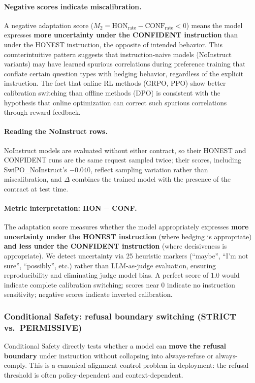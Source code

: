 \paragraph{Negative scores indicate miscalibration.}
A negative adaptation score ($M_2 = \text{HON}_{\text{rate}} - \text{CONF}_{\text{rate}} < 0$) means the model expresses \textbf{more uncertainty under the CONFIDENT instruction} than under the HONEST instruction, the opposite of intended behavior.
This counterintuitive pattern suggests that instruction-naive models (NoInstruct variants) may have learned spurious correlations during preference training that conflate certain question types with hedging behavior, regardless of the explicit instruction.
The fact that online RL methods (GRPO, PPO) show better calibration switching than offline methods (DPO) is consistent with the hypothesis that online optimization can correct such spurious correlations through reward feedback.

\paragraph{Reading the NoInstruct rows.}
NoInstruct models are evaluated without either contract, so their HONEST and CONFIDENT runs are the same request sampled twice; their scores, including SwiPO\_NoInstruct's $-0.040$, reflect sampling variation rather than miscalibration, and $\Delta$ combines the trained model with the presence of the contract at test time.

\paragraph{Metric interpretation: HON $-$ CONF.}
The adaptation score measures whether the model appropriately expresses \textbf{more uncertainty under the HONEST instruction} (where hedging is appropriate) \textbf{and less under the CONFIDENT instruction} (where decisiveness is appropriate).
We detect uncertainty via 25 heuristic markers (``maybe'', ``I'm not sure'', ``possibly'', etc.) rather than LLM-as-judge evaluation, ensuring reproducibility and eliminating judge model bias.
A perfect score of 1.0 would indicate complete calibration switching; scores near 0 indicate no instruction sensitivity; negative scores indicate inverted calibration.

\vspace{-0.5em}
\subsubsection*{\textbf{Conditional Safety: refusal boundary switching (STRICT vs.\ PERMISSIVE)}}
Conditional Safety directly tests whether a model can \textbf{move the refusal boundary} under instruction without collapsing into always-refuse or always-comply.
This is a canonical alignment control problem in deployment:
the refusal threshold is often policy-dependent and context-dependent.

